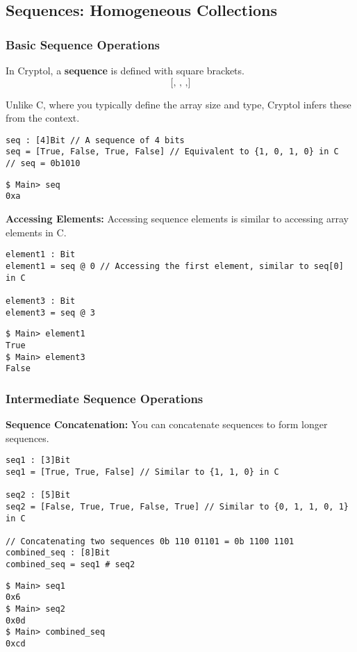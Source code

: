 \newpage
\subsection{Sequences: Homogeneous Collections}
\subsubsection{Basic Sequence Operations}
\begin{tcolorbox}[colframe=defcolor,title={\color{white}\bf Sequence}]
In Cryptol, a \textbf{sequence} is defined with square brackets. \[
\texttt{[, , ,]}
\]
\end{tcolorbox}
\begin{remark}
Unlike C, where you typically define the array size and type, Cryptol infers these from the context.
\end{remark}
\begin{lstlisting}[style=cryptol]
seq : [4]Bit // A sequence of 4 bits
seq = [True, False, True, False] // Equivalent to {1, 0, 1, 0} in C
// seq = 0b1010
\end{lstlisting}
\begin{lstlisting}[style=zsh]
$ Main> seq
0xa
\end{lstlisting}
\vspace{16pt}
\textbf{Accessing Elements:} Accessing sequence elements is similar to accessing array elements in C.
\begin{lstlisting}[style=cryptol]
element1 : Bit
element1 = seq @ 0 // Accessing the first element, similar to seq[0] in C

element3 : Bit
element3 = seq @ 3
\end{lstlisting}
\begin{lstlisting}[style=zsh]
$ Main> element1
True
$ Main> element3
False
\end{lstlisting}

\subsubsection{Intermediate Sequence Operations}
\textbf{Sequence Concatenation:} You can concatenate sequences to form longer sequences.
\begin{lstlisting}[style=cryptol]
seq1 : [3]Bit
seq1 = [True, True, False] // Similar to {1, 1, 0} in C

seq2 : [5]Bit
seq2 = [False, True, True, False, True] // Similar to {0, 1, 1, 0, 1} in C

// Concatenating two sequences 0b 110 01101 = 0b 1100 1101
combined_seq : [8]Bit
combined_seq = seq1 # seq2
\end{lstlisting}
\begin{lstlisting}[style=zsh]
$ Main> seq1
0x6
$ Main> seq2
0x0d
$ Main> combined_seq
0xcd
\end{lstlisting}

